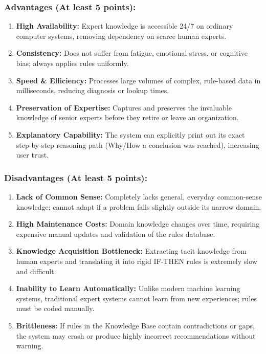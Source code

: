 \subsubsection{Advantages (At least 5 points):}
\begin{enumerate}
  \item \textbf{High Availability:} Expert knowledge is accessible 24/7 on ordinary computer systems, removing dependency on scarce human experts.
  \item \textbf{Consistency:} Does not suffer from fatigue, emotional stress, or cognitive bias; always applies rules uniformly.
  \item \textbf{Speed \& Efficiency:} Processes large volumes of complex, rule-based data in milliseconds, reducing diagnosis or lookup times.
  \item \textbf{Preservation of Expertise:} Captures and preserves the invaluable knowledge of senior experts before they retire or leave an organization.
  \item \textbf{Explanatory Capability:} The system can explicitly print out its exact step-by-step reasoning path (Why/How a conclusion was reached), increasing user trust.
\end{enumerate}

\subsubsection{Disadvantages (At least 5 points):}
\begin{enumerate}
  \item \textbf{Lack of Common Sense:} Completely lacks general, everyday common-sense knowledge; cannot adapt if a problem falls slightly outside its narrow domain.
  \item \textbf{High Maintenance Costs:} Domain knowledge changes over time, requiring expensive manual updates and validation of the rules database.
  \item \textbf{Knowledge Acquisition Bottleneck:} Extracting tacit knowledge from human experts and translating it into rigid IF-THEN rules is extremely slow and difficult.
  \item \textbf{Inability to Learn Automatically:} Unlike modern machine learning systems, traditional expert systems cannot learn from new experiences; rules must be coded manually.
  \item \textbf{Brittleness:} If rules in the Knowledge Base contain contradictions or gaps, the system may crash or produce highly incorrect recommendations without warning.
\end{enumerate}
